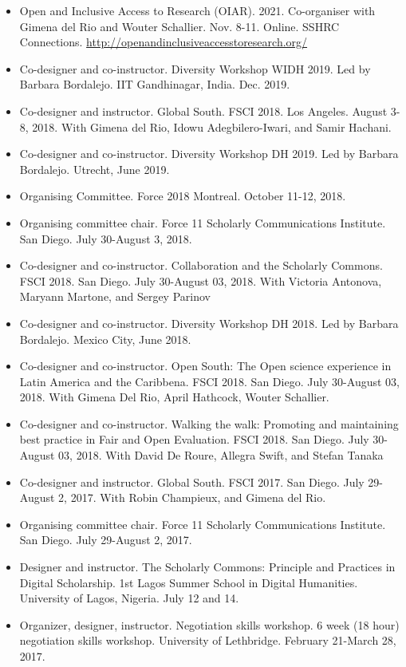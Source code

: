 \documentclass[12pt]{article}
\begin{document}
\begin{itemize}
  \item Open and Inclusive Access to Research (OIAR). 2021. Co-organiser with Gimena del Rio and Wouter Schallier. Nov. 8-11. Online. SSHRC Connections. \url{http://openandinclusiveaccesstoresearch.org/}
  \item Co-designer and co-instructor. Diversity Workshop WIDH 2019. Led by Barbara Bordalejo. IIT Gandhinagar, India. Dec. 2019.
  \item Co-designer and instructor. Global South. FSCI 2018. Los Angeles. August 3-8, 2018. With Gimena del Rio, Idowu Adegbilero-Iwari, and Samir Hachani.
  \item Co-designer and co-instructor. Diversity Workshop DH 2019. Led by Barbara Bordalejo. Utrecht, June 2019.
  \item Organising Committee. Force 2018 Montreal. October 11-12, 2018.
  \item Organising committee chair. Force 11 Scholarly Communications Institute. San Diego. July 30-August 3, 2018.
  \item Co-designer and co-instructor. Collaboration and the Scholarly Commons. FSCI 2018. San Diego. July 30-August 03, 2018. With Victoria Antonova, Maryann Martone, and Sergey Parinov
  \item Co-designer and co-instructor. Diversity Workshop DH 2018. Led by Barbara Bordalejo. Mexico City, June 2018.
  \item Co-designer and co-instructor. Open South: The Open science experience in Latin America and the Caribbena. FSCI 2018. San Diego. July 30-August 03, 2018. With Gimena Del Rio, April Hathcock, Wouter Schallier.
  \item Co-designer and co-instructor. Walking the walk: Promoting and maintaining best practice in Fair and Open Evaluation. FSCI 2018. San Diego. July 30-August 03, 2018. With David De Roure, Allegra Swift, and Stefan Tanaka
  \item Co-designer and instructor. Global South. FSCI 2017. San Diego. July 29-August 2, 2017. With Robin Champieux, and Gimena del Rio.
  \item Organising committee chair. Force 11 Scholarly Communications Institute. San Diego. July 29-August 2, 2017.
  \item Designer and instructor. The Scholarly Commons: Principle and Practices in Digital Scholarship.  1st Lagos Summer School in Digital Humanities. University of Lagos, Nigeria. July 12 and 14.
  \item Organizer, designer, instructor. Negotiation skills workshop. 6 week (18 hour) negotiation skills workshop. University of Lethbridge. February 21-March 28, 2017.

\end{itemize}
\end{document}
